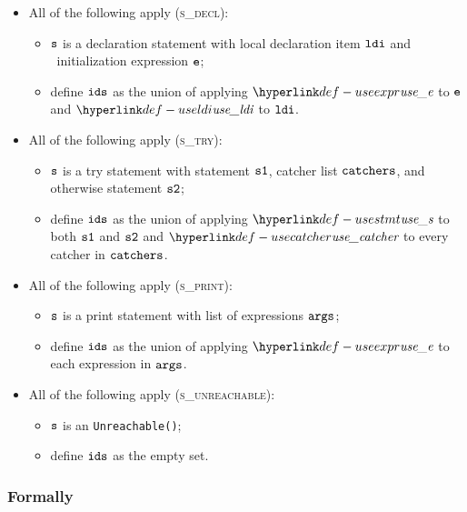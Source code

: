 \begin{itemize}
  \item All of the following apply (\textsc{s\_decl}):
  \begin{itemize}
    \item $\vs$ is a declaration statement with local declaration item $\ldi$ and \optional\ initialization expression $\ve$;
    \item define $\ids$ as the union of applying $\useexpr$ to $\ve$ and $\useldi$ to $\ldi$.
  \end{itemize}

  \item All of the following apply (\textsc{s\_try}):
  \begin{itemize}
    \item $\vs$ is a try statement with statement $\vsone$, catcher list $\catchers$, and otherwise statement $\vstwo$;
    \item define $\ids$ as the union of applying $\usestmt$ to both $\vsone$ and $\vstwo$ and $\usecatcher$ to
          every catcher in $\catchers$.
  \end{itemize}

  \item All of the following apply (\textsc{s\_print}):
  \begin{itemize}
    \item $\vs$ is a print statement with list of expressions $\vargs$;
    \item define $\ids$ as the union of applying $\useexpr$ to each expression in $\vargs$.
  \end{itemize}

  \item All of the following apply (\textsc{s\_unreachable}):
  \begin{itemize}
    \item $\vs$ is an \texttt{Unreachable()};
    \item define $\ids$ as the empty set.
  \end{itemize}
\end{itemize}

\subsubsection{Formally}
\begin{mathpar}
\end{mathpar}

